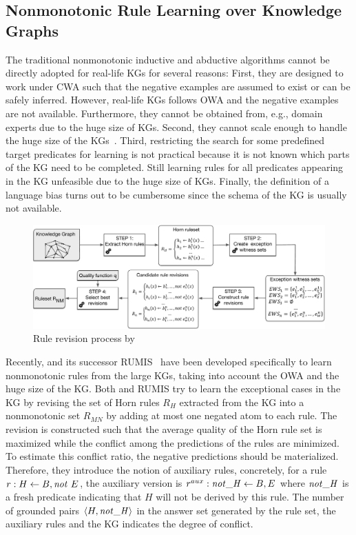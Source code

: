 


\subsection{Nonmonotonic Rule Learning over Knowledge Graphs}
The traditional nonmonotonic inductive and abductive algorithms cannot be directly adopted for real-life KGs for several reasons:
First, they are designed to work under CWA such that the negative examples are assumed to exist or can be safely inferred. However, real-life KGs follows OWA and the negative examples are not available. Furthermore, they cannot be obtained from, e.g., domain experts due to the huge size of KGs.
Second, they cannot scale enough to handle the huge size of the KGs~\cite{Shakerin2018}. 
Third, restricting the search for some predefined target predicates for learning is not practical because
it is not known which parts of the KG need to be completed. Still learning rules for all predicates appearing in the KG unfeasible due to the huge
size of KGs. Finally,
the definition of a language bias turns out to be cumbersome since the schema of the
KG is usually not available.


\begin{figure}[t]
\centering
\includegraphics[width=\textwidth]{figures/overview}
\caption{Rule revision process by~\cite{gad2016,rumis}}
\label{fig:iswc_process}
\end{figure}
Recently, \cite{gad2016} and its successor RUMIS~\cite{rumis} have been developed specifically to learn nonmonotonic rules from the large KGs, taking into account the OWA and the huge size of the KG. Both \cite{gad2016} and RUMIS try to learn the exceptional cases in the KG by revising the set of Horn rules $R_H$ extracted from the KG into a nonmonotonic set $R_{MN}$ by adding at most one negated atom to each rule. The revision is constructed such that the average quality of the Horn rule set is maximized while the conflict among the predictions of the rules are minimized. To estimate this conflict ratio, the negative predictions should be materialized. Therefore, they introduce the notion of auxiliary rules, concretely, for a rule 
$r:H \leftarrow B, \mathit{not}~ E$, the auxiliary version is $r^{aux}:\mathit{not\_H} \leftarrow B, E$ where $\mathit{not\_H}$ is a fresh predicate indicating that $H$ will not be derived by this rule. The number of grounded pairs $\langle H,\mathit{not\_H}\rangle$ in the answer set generated by the rule set, the auxiliary rules and the KG indicates the degree of conflict.



